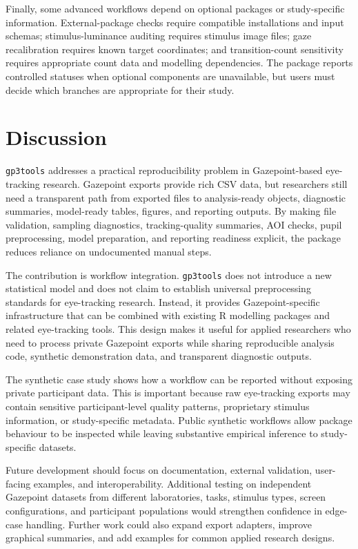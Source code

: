 \documentclass[
]{article}
\begin{document}
Finally, some advanced workflows depend on optional packages or
study-specific information. External-package checks require compatible
installations and input schemas; stimulus-luminance auditing requires
stimulus image files; gaze recalibration requires known target
coordinates; and transition-count sensitivity requires appropriate count
data and modelling dependencies. The package reports controlled statuses
when optional components are unavailable, but users must decide which
branches are appropriate for their study.

\section{Discussion}\label{discussion}

\texttt{gp3tools} addresses a practical reproducibility problem in
Gazepoint-based eye-tracking research. Gazepoint exports provide rich
CSV data, but researchers still need a transparent path from exported
files to analysis-ready objects, diagnostic summaries, model-ready
tables, figures, and reporting outputs. By making file validation,
sampling diagnostics, tracking-quality summaries, AOI checks, pupil
preprocessing, model preparation, and reporting readiness explicit, the
package reduces reliance on undocumented manual steps.

The contribution is workflow integration. \texttt{gp3tools} does not
introduce a new statistical model and does not claim to establish
universal preprocessing standards for eye-tracking research. Instead, it
provides Gazepoint-specific infrastructure that can be combined with
existing R modelling packages and related eye-tracking tools. This
design makes it useful for applied researchers who need to process
private Gazepoint exports while sharing reproducible analysis code,
synthetic demonstration data, and transparent diagnostic outputs.

The synthetic case study shows how a workflow can be reported without
exposing private participant data. This is important because raw
eye-tracking exports may contain sensitive participant-level quality
patterns, proprietary stimulus information, or study-specific metadata.
Public synthetic workflows allow package behaviour to be inspected while
leaving substantive empirical inference to study-specific datasets.

Future development should focus on documentation, external validation,
user-facing examples, and interoperability. Additional testing on
independent Gazepoint datasets from different laboratories, tasks,
stimulus types, screen configurations, and participant populations would
strengthen confidence in edge-case handling. Further work could also
expand export adapters, improve graphical summaries, and add examples
for common applied research designs.
\end{document}
